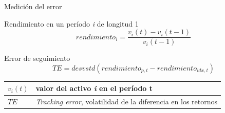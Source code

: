 \documentclass[aspectratio=169,xcolor=dvipsnames]{beamer}
\begin{document}
\begin{frame}{Medición del error}
    \begin{block}{Rendimiento en un período \textit{i} de longitud 1}
        \begin{equation}
            rendimiento_{i} = \frac{v_{i}(t)-v_{i}(t-1)}{v_{i}(t-1)} \tag{8}   
        \end{equation}
    \end{block}
    \vspace{0.5cm}
    \begin{block}{Error de seguimiento}
        \begin{equation}
            TE = desvstd(rendimiento_{p,t}-rendimiento_{idx,t})  \tag{9}   
        \end{equation}
    \end{block}
    \vspace{0.5cm}    
    \small %
    \begin{tabularx}{\textwidth}{@{}lX@{}}
    \toprule
    $v_{i}(t)$ & valor del activo \emph{i} en el período t \\
    \midrule
    $TE$ & \textit{Tracking error}, volatilidad de la diferencia en los retornos \\
    \bottomrule
    \end{tabularx}
\end{frame}
\end{document}
